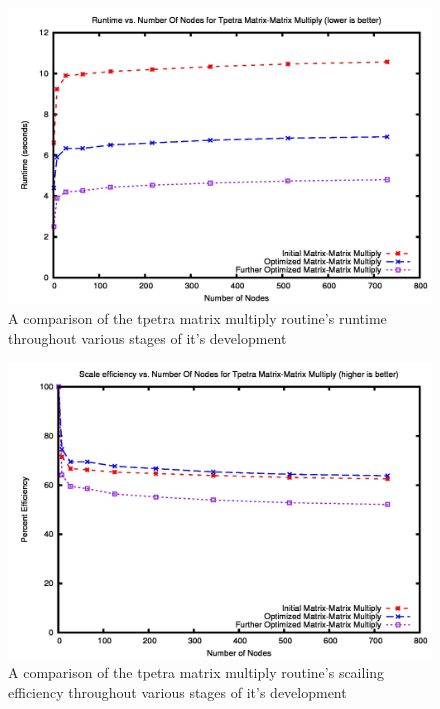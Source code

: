 \documentclass{article}
\begin{document}
\begin{figure}
\includegraphics[scale=.4]{tpetratime.jpg}
\caption[Time Comparison]{A comparison of the tpetra matrix multiply routine's runtime 
throughout various stages of it's development}
\label{tpetracomptime}
\end{figure}

\begin{figure}
\includegraphics[scale=.4]{tpetraeff.jpg}
\caption[Efficiency Comparison]{A comparison of the tpetra matrix multiply routine's scailing efficiency
throughout various stages of it's development}
\label{tpetracompeff}
\end{figure}
\end{document}
